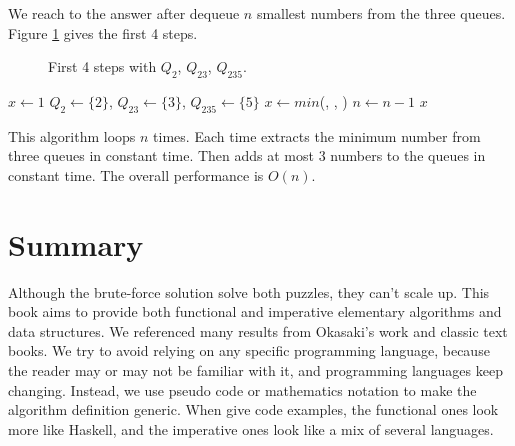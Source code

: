 \documentclass[b5paper]{article}
\begin{document}
We reach to the answer after dequeue $n$ smallest numbers from the three queues. Figure \ref{fig:q235} gives the first 4 steps.

\begin{figure}[htbp]
  \centering
  \caption{First 4 steps with $Q_2$, $Q_{23}$, $Q_{235}$.}
  \label{fig:q235}
\end{figure}

\begin{algorithmic}[1]
  \State $x \gets 1$
  \State $Q_2 \gets \{ 2 \}$, $Q_{23} \gets \{ 3 \}$, $Q_{235} \gets \{ 5 \}$
    \State $x \gets min$(, , )
      \State {}
      \State {}
      \State {}
      \State {}
      \State {}
      \State {}
      \State {}
    \Else
      \State {}
      \State {}
    \EndIf
    \State $n \gets n - 1$
  \EndWhile
  \State \Return $x$
\EndFunction
\end{algorithmic}

This algorithm loops $n$ times. Each time extracts the minimum number from three queues in constant time. Then adds at most 3 numbers to the queues in constant time. The overall performance is $O(n)$.

\section*{Summary}
Although the brute-force solution solve both puzzles, they can't scale up. This book aims to provide both functional and imperative elementary algorithms and data structures. We referenced many results from Okasaki's work\cite{okasaki-book} and classic text books\cite{CLRS}. We try to avoid relying on any specific programming language, because the reader may or may not be familiar with it, and programming languages keep changing. Instead, we use pseudo code or mathematics notation to make the algorithm definition generic. When give code examples, the functional ones look more like Haskell, and the imperative ones look like a mix of several languages.
\end{document}

